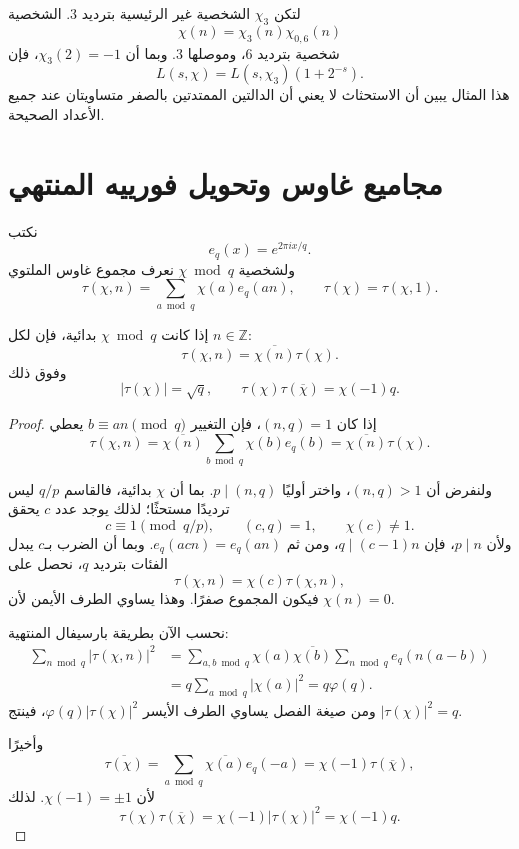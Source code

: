 \begin{example}
لتكن \(\chi_3\) الشخصية غير الرئيسية بترديد \(3\). الشخصية
\[
\chi(n)=\chi_3(n)\chi_{0,6}(n)
\]
شخصية بترديد \(6\)، وموصلها \(3\). وبما أن \(\chi_3(2)=-1\)، فإن
\[
L(s,\chi)=L(s,\chi_3)(1+2^{-s}).
\]
هذا المثال يبين أن الاستحثاث لا يعني أن الدالتين الممتدتين بالصفر
متساويتان عند جميع الأعداد الصحيحة.
\end{example}

\section{مجاميع غاوس وتحويل فورييه المنتهي}

نكتب
\[
e_q(x)=e^{2\pi i x/q}.
\]
ولشخصية \(\chi\bmod q\) نعرف مجموع غاوس الملتوي
\[
\tau(\chi,n)
=
\sum_{a\bmod q}\chi(a)e_q(an),
\qquad
\tau(\chi)=\tau(\chi,1).
\]

\begin{theorem}
\label{thm:primitive-gauss-sum}
\provedhere
إذا كانت \(\chi\bmod q\) بدائية، فإن لكل \(n\in\mathbb Z\):
\[
\tau(\chi,n)=\overline{\chi(n)}\tau(\chi).
\]
وفوق ذلك
\[
|\tau(\chi)|=\sqrt q,
\qquad
\tau(\chi)\tau(\overline\chi)=\chi(-1)q.
\]
\end{theorem}

\begin{proof}
إذا كان \((n,q)=1\)، فإن التغيير \(b\equiv an\pmod q\) يعطي
\[
\tau(\chi,n)
=
\overline{\chi(n)}
\sum_{b\bmod q}\chi(b)e_q(b)
=
\overline{\chi(n)}\tau(\chi).
\]

ولنفرض أن \((n,q)>1\)، واختر أوليًا \(p\mid(n,q)\). بما أن \(\chi\)
بدائية، فالقاسم \(q/p\) ليس ترديدًا مستحثًا؛ لذلك يوجد عدد \(c\) يحقق
\[
c\equiv1\pmod{q/p},
\qquad
(c,q)=1,
\qquad
\chi(c)\ne1.
\]
ولأن \(p\mid n\)، فإن \(q\mid(c-1)n\)، ومن ثم
\(e_q(acn)=e_q(an)\). وبما أن الضرب بـ\(c\) يبدل الفئات بترديد \(q\)،
نحصل على
\[
\tau(\chi,n)=\chi(c)\tau(\chi,n),
\]
فيكون المجموع صفرًا. وهذا يساوي الطرف الأيمن لأن \(\chi(n)=0\).

نحسب الآن بطريقة بارسيفال المنتهية:
\begin{align*}
\sum_{n\bmod q}|\tau(\chi,n)|^2
&=
\sum_{a,b\bmod q}\chi(a)\overline{\chi(b)}
\sum_{n\bmod q}e_q(n(a-b))\\
&=q\sum_{a\bmod q}|\chi(a)|^2
=q\varphi(q).
\end{align*}
ومن صيغة الفصل يساوي الطرف الأيسر
\(\varphi(q)|\tau(\chi)|^2\)، فينتج
\(|\tau(\chi)|^2=q\).

وأخيرًا
\[
\overline{\tau(\chi)}
=
\sum_{a\bmod q}\overline{\chi(a)}e_q(-a)
=
\chi(-1)\tau(\overline\chi),
\]
لأن \(\chi(-1)=\pm1\). لذلك
\[
\tau(\chi)\tau(\overline\chi)
=
\chi(-1)|\tau(\chi)|^2
=
\chi(-1)q.
\]
\end{proof}

